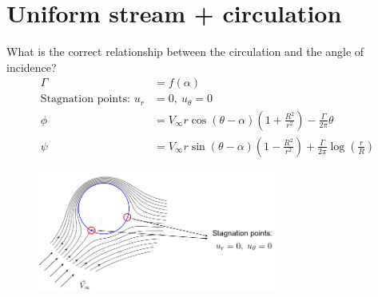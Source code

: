 \documentclass[class=report, crop=false, 12pt,a4paper]{standalone}
\begin{document}
\section{Uniform stream + circulation}
What is the correct relationship between the circulation and the angle of incidence?
\begin{align}
  \Gamma &= f(\alpha)\\
  \textrm{Stagnation points: } u_r &= 0, \ u_\theta = 0\\
  \phi &= V_\infty r \cos{(\theta - \alpha)}\left(1 + \frac{R^2}{r^2}\right) - \frac{\Gamma}{2\pi}\theta\\
  \psi &= V_\infty r \sin{(\theta - \alpha)}\left(1 - \frac{R^2}{r^2}\right) + \frac{\Gamma}{2\pi} \log{\left(\frac{r}{R}\right)}
\end{align}
\begin{figure}[H]
  \centering
  \includegraphics[width = 0.7\textwidth]{../img/diagram37.png}
\end{figure}
\end{document}
